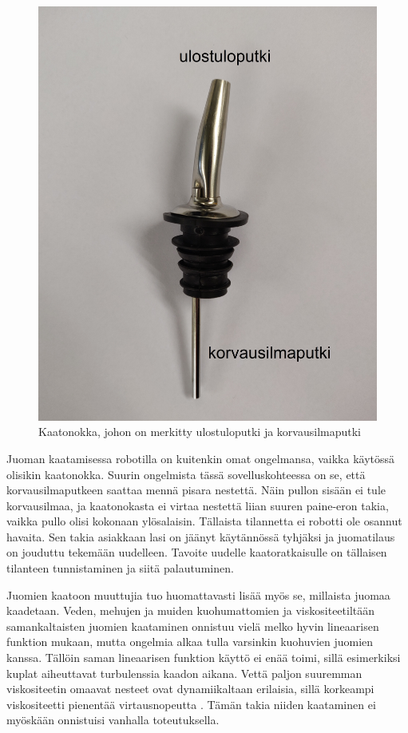 \begin{figure}[h]
\begin{center}
\includegraphics[scale=0.08]{img/kaatonokka.jpg}
\caption{Kaatonokka, johon on merkitty ulostuloputki ja korvausilmaputki}
\label{fig:kaatonokka}
\end{center}
\end{figure}

Juoman kaatamisessa robotilla on kuitenkin omat ongelmansa, vaikka käytössä olisikin kaatonokka. Suurin ongelmista tässä sovelluskohteessa on se, että korvausilmaputkeen saattaa mennä pisara nestettä. Näin pullon sisään ei tule korvausilmaa, ja kaatonokasta ei virtaa nestettä liian suuren paine-eron takia, vaikka pullo olisi kokonaan ylösalaisin. Tällaista tilannetta ei robotti ole osannut havaita. Sen takia asiakkaan lasi on jäänyt käytännössä tyhjäksi ja juomatilaus on jouduttu tekemään uudelleen. Tavoite uudelle kaatoratkaisulle on tällaisen tilanteen tunnistaminen ja siitä palautuminen.

Juomien kaatoon muuttujia tuo huomattavasti lisää myös se, millaista juomaa kaadetaan. Veden, mehujen ja muiden kuohumattomien ja viskositeetiltään samankaltaisten juomien kaataminen onnistuu vielä melko hyvin lineaarisen funktion mukaan, mutta ongelmia alkaa tulla varsinkin kuohuvien juomien kanssa. Tällöin saman lineaarisen funktion käyttö ei enää toimi, sillä esimerkiksi kuplat aiheuttavat turbulenssia kaadon aikana. Vettä paljon suuremman viskositeetin omaavat nesteet ovat dynamiikaltaan erilaisia, sillä korkeampi viskositeetti pienentää virtausnopeutta \cite{Lumen2021}. Tämän takia niiden kaataminen ei myöskään onnistuisi vanhalla toteutuksella.

